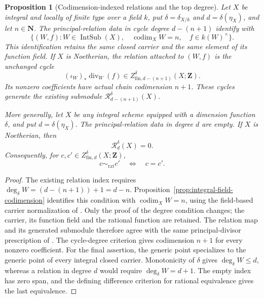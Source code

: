 \documentclass[11pt]{article}
\newtheorem{proposition}[theorem]{Proposition}
\theoremstyle{definition}
\theoremstyle{remark}
\begin{document}
\begin{proposition}[Codimension-indexed relations and the top degree]
\label{prop:principal-relation-codimension}
Let \(X\) be integral and locally of finite type over a field \(k\),
put \(\delta=\delta_{X/k}\) and \(d=\delta(\eta_X)\), and let
\(n\in\mathbf N\). The principal-relation data in cycle degree
\(d-(n+1)\) identify with
\[
 \bigl\{(W,f):W\in\operatorname{IntSub}(X),\quad
       \operatorname{codim}_X W=n,\quad f\in k(W)^\times\bigr\}.
\]
This identification retains the same closed carrier and the same
element of its function field. If \(X\) is Noetherian, the relation
attached to \((W,f)\) is the unchanged cycle
\[
 (\iota_W)_*\operatorname{div}_W(f)
       \in Z^\delta_{\mathrm{fin},d-(n+1)}(X;\mathbf Z).
\]
Its nonzero coefficients have actual chain codimension \(n+1\).
These cycles generate the existing submodule
\(\mathcal R_{d-(n+1)}^\delta(X)\).

More generally, let \(X\) be any integral scheme equipped with a
dimension function \(\delta\), and put \(d=\delta(\eta_X)\).
The principal-relation data in degree \(d\) are empty.
If \(X\) is Noetherian, then
\[
 \mathcal R_d^\delta(X)=0.
\]
Consequently, for \(c,c'\in Z^\delta_{\mathrm{fin},d}(X;\mathbf Z)\),
\[
 c\sim_{\mathrm{rat}}c'\quad\Longleftrightarrow\quad c=c'.
\]
\end{proposition}

\begin{proof}
The existing relation index requires
\(\deg_\delta W=(d-(n+1))+1=d-n\).
Proposition~\ref{prop:integral-field-codimension} identifies this
condition with \(\operatorname{codim}_X W=n\), using the
field-based carrier normalization of
\cite{StacksCycleDimensionComparison}. Only the proof of the
degree condition changes; the carrier, its function field and the
rational function are retained. The relation map and its generated
submodule therefore agree with the same principal-divisor
prescription of \cite{StacksRationalEquivalence}. The cycle-degree
criterion gives codimension \(n+1\) for every nonzero coefficient.
For the final assertion, the generic point specializes to the
generic point of every integral closed carrier. Monotonicity of
\(\delta\) gives \(\deg_\delta W\leq d\), whereas a relation
in degree \(d\) would require \(\deg_\delta W=d+1\).
The empty index has zero span, and the defining difference
criterion for rational equivalence gives the last equivalence.
\end{proof}
\end{document}
